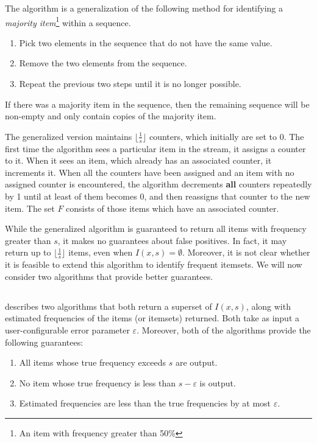 \documentclass[landscape,twocolumn,a4paper]{article}
\begin{document}
The algorithm is a generalization of the following method for identifying a \textit{majority item}\footnote{An item with frequency greater than 50\%} within a sequence.
\begin{enumerate}
\item Pick two elements in the sequence that do not have the same value.
\item Remove the two elements from the sequence.
\item Repeat the previous two steps until it is no longer possible.
\end{enumerate}
If there was a majority item in the sequence, then the remaining sequence will be non-empty and only contain copies of the majority item.

The generalized version maintains $\lfloor \frac{1}{s} \rfloor$ counters, which initially are set to 0. The first time the algorithm sees a particular item in the stream, it assigns a counter to it. When it sees an item, which already has an associated counter, it increments it. When all the counters have been assigned and an item with no assigned counter is encountered, the algorithm decrements \textbf{all} counters repeatedly by 1 until at least of them becomes 0, and then reassigns that counter to the new item. The set $F$ consists of those items which have an associated counter.

While the generalized algorithm is guaranteed to return all items with frequency greater than $s$, it makes no guarantees about false positives. In fact, it may return up to $\lfloor \frac{1}{s} \rfloor$ items, even when $I(x, s) = \emptyset$. Moreover, it is not clear whether it is feasible to extend this algorithm to identify frequent itemsets. We will now consider two algorithms that provide better guarantees.

\subsection{\cite{Manku02approximatefrequency}}
\cite{Manku02approximatefrequency} describes two algorithms that both return a superset of $I(x, s)$, along with estimated frequencies of the items (or itemsets) returned. Both take as input a user-configurable error parameter $\varepsilon$. Moreover, both of the algorithms provide the following guarantees:
\begin{enumerate}
\item All items whose true frequency exceeds $s$ are output.
\item No item whose true frequency is less than $s - \varepsilon$ is output.
\item Estimated frequencies are less than the true frequencies by at most $\varepsilon$.
\end{enumerate}
\end{document}
